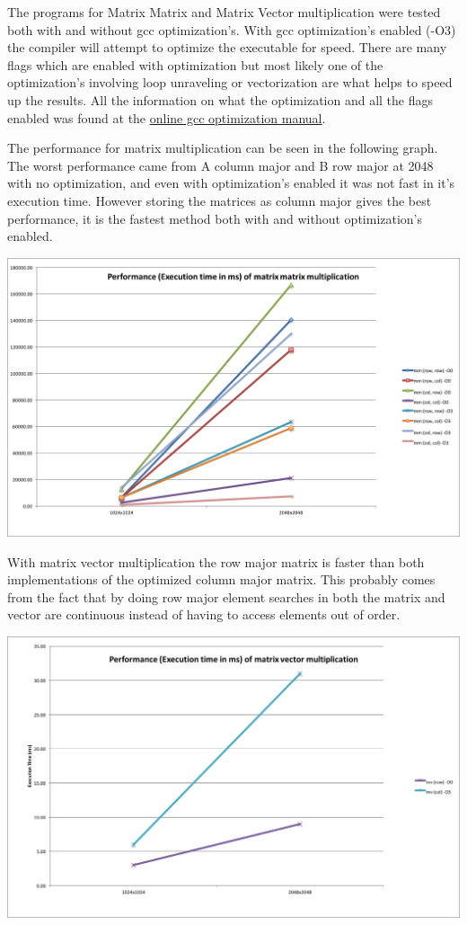 \documentclass[a4paper]{article}
\begin{document}
The programs for Matrix Matrix and Matrix Vector multiplication were tested both with and without gcc optimization's. With gcc optimization's enabled (-O3) the compiler will attempt to optimize the executable for speed. There are many flags which are enabled with optimization but most likely one of the optimization's involving loop unraveling or vectorization are what helps to speed up the results. All the information on what the optimization and all the flags enabled was found at the \href{https://gcc.gnu.org/onlinedocs/gcc/Optimize-Options.html}{online gcc optimization manual}.

The performance for matrix multiplication can be seen in the following graph. The worst performance came from A column major and B row major at 2048 with no optimization, and even with optimization's enabled it was not fast in it's execution time. However storing the matrices as column major gives the best performance, it is the fastest method both with and without optimization's enabled.
\begin{center}
    \includegraphics[scale=0.5]{mm.png} \\
\end{center}

With matrix vector multiplication the row major matrix is faster than both implementations of the optimized column major matrix. This probably comes from the fact that by doing row major element searches in both the matrix and vector are continuous instead of having to access elements out of order.
\begin{center}
    \includegraphics[scale=0.5]{mv.png} \\
\end{center}
\end{document}
